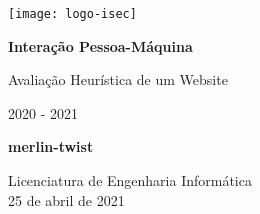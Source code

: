 \begin{titlepage}
	\begin{center}
		\texttt{[image: logo-isec]}
		
		\vspace*{\fill}
		
		\Huge
		\textbf{Interação Pessoa-Máquina}
		
		\huge
		Avaliação Heurística de um Website
		
		\vspace{0.5cm}
		\LARGE
		2020 - 2021
		
		\vspace{1.5cm}
		
		\textbf{merlin-twist}
		
		\vfill
		\vspace*{\fill}
		
		\normalsize
		Licenciatura de Engenharia Informática \\
		25 de abril de 2021		
	\end{center}
\end{titlepage}